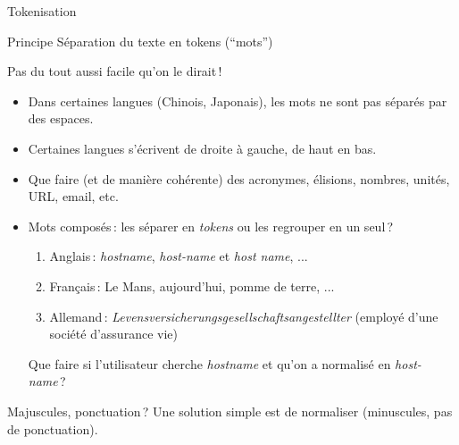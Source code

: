 \begin{frame}{Tokenisation}

\begin{beamerboxesrounded}{Principe}
Séparation du texte en \alert{tokens} (``mots'')
\end{beamerboxesrounded}

\smallskip


Pas du tout aussi facile qu'on le dirait\,!

\begin{itemize}

\item Dans certaines langues (Chinois, Japonais), les mots  \alert{ne sont pas}
séparés par des espaces.

\item Certaines langues s'écrivent de droite à gauche, de haut en bas.

\item Que faire (et de manière \alert{cohérente}) des acronymes, élisions, nombres, unités, URL, email, etc.

\item \alert{Mots composés}\,: les séparer en \emph{tokens} ou les regrouper en un seul\,?

\begin{enumerate}
   \item Anglais\,: \emph{hostname}, \emph{host-name} et \emph{host
name}, ...
  \item Français\,: Le Mans, aujourd'hui, pomme de terre, ...
  \item Allemand\,: \textit{Levensversicherungsgesellschaftsangestellter} (employé d’une
société d’assurance vie)
\end{enumerate}

 Que faire si l'utilisateur
cherche \emph{hostname} et qu'on a normalisé en \emph{host-name}\,?

\end{itemize}


Majuscules, ponctuation\,? Une solution simple est de normaliser (minuscules, pas de ponctuation).

\end{frame}

